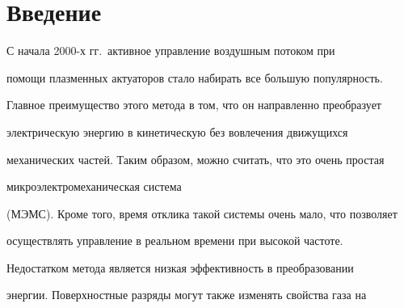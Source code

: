 \vspace*{-3pt}


     







\vspace*{-3pt}







  













      \thispagestyle{headings}





      


    \section{Введение}


     


     С начала 2000-х гг.\ активное управление воздушным потоком при 


помощи плазменных актуаторов стало набирать все большую популярность. 


Главное преимущество этого метода в том, что он направленно преобразует 


электрическую энергию в кинетическую без вовлечения движущихся 


механических частей. Таким образом, можно считать, что это очень простая 


микроэлектромеханическая сис\-те\-ма


(МЭМС). Кроме того, время отклика такой системы очень мало, что позволяет 


осуществлять управление в реальном времени при высокой частоте. 


Недостатком метода является низкая эффективность в преобразовании 


энергии. Поверхностные разряды могут также изменять свойства газа на 


